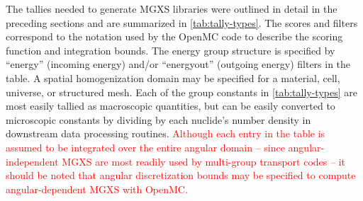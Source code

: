 The tallies needed to generate MGXS libraries were outlined in detail in the preceding sections and are summarized in \cref{tab:tally-types}. The scores and filters correspond to the notation used by the OpenMC code to describe the scoring function and integration bounds. The energy group structure is specified by ``energy'' (incoming energy) and/or ``energyout'' (outgoing energy) filters in the table. A spatial homogenization domain may be specified for a material, cell, universe, or structured mesh. Each of the group constants in \cref{tab:tally-types} are most easily tallied as macroscopic quantities, but can be easily converted to microscopic constants by dividing by each nuclide's number density in downstream data processing routines. \textcolor{red}{Although each entry in the table is assumed to be integrated over the entire angular domain -- since angular-independent MGXS are most readily used by multi-group transport codes -- it should be noted that angular discretization bounds may be specified to compute angular-dependent MGXS with OpenMC.}

